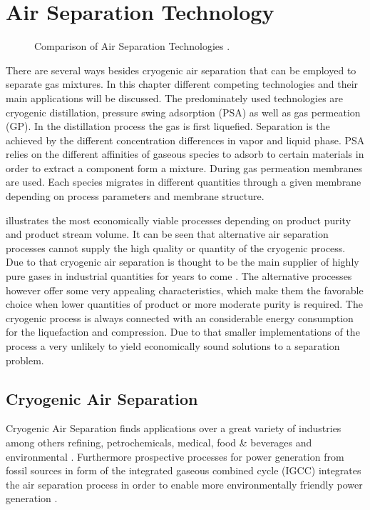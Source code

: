 \chapter{Air Separation Technology}
\label{chp:airsep}
\begin{figure}[h]
	
	\caption{Comparison of Air Separation Technologies \cite{Prasad.1994}.}
	\label{fig:tech_compar}
\end{figure}

There are several ways besides cryogenic air separation that can be employed to separate gas mixtures. 
In this chapter different competing technologies and their main applications will be discussed. The 
predominately used technologies are cryogenic distillation, pressure swing adsorption (PSA) as well as 
gas permeation (GP). In the distillation process the gas is first liquefied. Separation is the achieved 
by the different concentration differences in vapor and liquid phase. PSA relies on the different affinities 
of gaseous species to adsorb to certain materials in order to extract a component form a mixture. During gas 
permeation membranes are used. Each species migrates in different quantities through a given membrane
depending on process parameters and membrane structure. 

 illustrates the most economically viable processes depending on product
purity and product stream volume. It can be seen that alternative air separation processes 
cannot supply the high quality or quantity of the cryogenic process. Due to that cryogenic air separation is 
thought to be the main supplier of highly pure gases in industrial quantities for years to come 
\cite{Castle.2002}. 
The alternative processes however offer some very appealing characteristics, which make them the 
favorable choice when lower quantities of product or more moderate purity is required. The cryogenic 
process is always connected with an considerable energy consumption for the liquefaction and compression. 
Due to that smaller implementations of the process a very unlikely to yield economically sound solutions
to a separation problem. 

\addref

\section{Cryogenic Air Separation}
\label{sec:cryo_air_sep}
Cryogenic Air Separation finds applications over a great variety of industries among others refining, petrochemicals, medical, food \& beverages and environmental \cite{Sirdeshpande.2005}. Furthermore 
prospective processes for power generation from fossil sources in form of the integrated gaseous combined 
cycle (IGCC) integrates the air separation process in order to enable more environmentally friendly power 
generation \cite{Mahapatra.2010}. 

